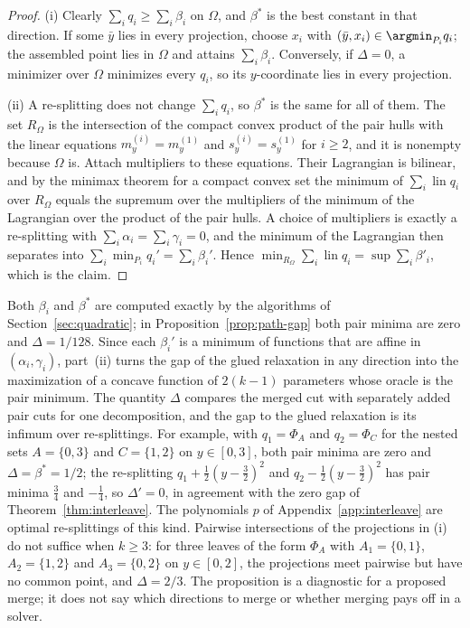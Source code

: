 \begin{proof}
(i) Clearly $\sum_iq_i\ge\sum_i\beta_i$ on $\Omega$, and $\beta^\ast$ is the
best constant in that direction. If some $\bar y$ lies in every projection,
choose $x_i$ with $(\bar y,x_i)\in\argmin_{P_i}q_i$; the assembled point lies
in $\Omega$ and attains $\sum_i\beta_i$. Conversely, if $\Delta=0$, a minimizer
over $\Omega$ minimizes every $q_i$, so its $y$-coordinate lies in every
projection.

(ii) A re-splitting does not change $\sum_iq_i$, so $\beta^\ast$ is the same for
all of them. The set $R_\Omega$ is the intersection of the compact convex
product of the pair hulls with the linear equations
$m_y^{(i)}=m_y^{(1)}$ and $s_y^{(i)}=s_y^{(1)}$ for $i\ge2$, and it is
nonempty because $\Omega$ is. Attach multipliers to these equations. Their
Lagrangian is bilinear, and by the minimax theorem for a compact convex
set \citep{Sion1958} the minimum of $\sum_i\operatorname{lin}q_i$ over
$R_\Omega$ equals the supremum over the multipliers of the minimum of the
Lagrangian over the product of the pair hulls. A choice of multipliers is
exactly a re-splitting with $\sum_i\alpha_i=\sum_i\gamma_i=0$, and the minimum
of the Lagrangian then separates into $\sum_i\min_{P_i}q_i'=\sum_i\beta_i'$.
Hence $\min_{R_\Omega}\sum_i\operatorname{lin}q_i=\sup\sum_i\beta'_i$, which is
the claim.
\end{proof}

Both $\beta_i$ and $\beta^\ast$ are computed exactly by the algorithms of
Section~\ref{sec:quadratic}; in Proposition~\ref{prop:path-gap} both pair
minima are zero and $\Delta=1/128$. Since each $\beta_i'$ is a minimum of
functions that are affine in $(\alpha_i,\gamma_i)$, part~(ii) turns the gap of
the glued relaxation in any direction into the maximization of a concave
function of $2(k-1)$ parameters whose oracle is the pair minimum. The quantity $\Delta$ compares the merged
cut with separately added pair cuts for one decomposition, and the gap to
the glued relaxation is its infimum over re-splittings. For example, with
$q_1=\Phi_A$ and $q_2=\Phi_C$ for the nested sets $A=\{0,3\}$ and $C=\{1,2\}$
on $y\in[0,3]$, both pair minima are zero and $\Delta=\beta^\ast=1/2$; the
re-splitting $q_1+\tfrac12(y-\tfrac32)^2$ and $q_2-\tfrac12(y-\tfrac32)^2$ has
pair minima $\tfrac34$ and $-\tfrac14$, so $\Delta'=0$, in agreement with the
zero gap of Theorem~\ref{thm:interleave}. The polynomials $p$ of
Appendix~\ref{app:interleave} are optimal re-splittings of this kind.
Pairwise intersections of the projections in (i) do not suffice when
$k\ge3$: for three leaves of the form $\Phi_A$ with $A_1=\{0,1\}$,
$A_2=\{1,2\}$ and $A_3=\{0,2\}$ on $y\in[0,2]$, the projections meet pairwise
but have no common point, and $\Delta=2/3$. The proposition is a diagnostic
for a proposed merge; it does not say which directions to merge or whether
merging pays off in a solver.
